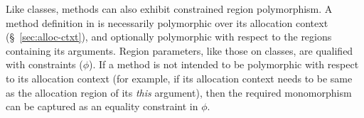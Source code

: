 


Like classes, methods can also exhibit constrained region
polymorphism.  A method definition in \FB is necessarily polymorphic
over its allocation context (\S~\ref{sec:alloc-ctxt}), and
optionally polymorphic with respect to the regions containing its
arguments.  Region parameters, like those on classes, are qualified
with constraints ($\phi$).
If a method is not intended to be polymorphic with respect to its
allocation context (for example, if its allocation context needs to be
same as the allocation region of its \emph{this} argument), then the
required monomorphism can be captured as an equality constraint in
$\phi$.  

